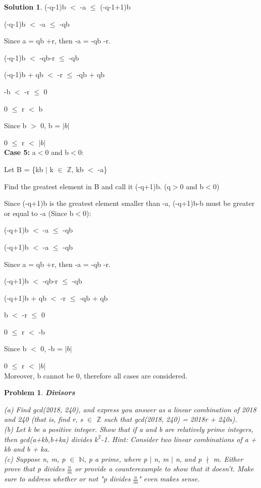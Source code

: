 \documentclass{article}
\newtheorem{problem}{Problem}
\theoremstyle{definition}
\newtheorem*{solution}{Solution}
\begin{document}
\begin{solution}
(-q-1)b \(<\) -a \(\leq\) (-q-1+1)b

(-q-1)b \(<\) -a \(\leq\) -qb

Since a = qb +r, then -a = -qb -r.

(-q-1)b \(<\) -qb-r \(\leq\) -qb

(-q-1)b + qb \(<\) -r \(\leq\) -qb + qb

-b \(<\) -r \(\leq\) 0

0 \(\leq\) r \(<\) b

Since b \(>\) 0, b = \(|b|\)

0 \(\leq\) r \(<\) \(|b|\)\\



\textbf{Case 5:} a\(<\)0 and b\(<\)0:

Let B = \{kb \(|\) k \(\in\) \(\mathbb{Z}\), kb \(<\) -a\}

Find the greatest element in B and call it (-q+1)b. (q\(>\)0 and b\(<\)0)

Since (-q+1)b is the greatest element smaller than -a, (-q+1)b-b must be greater or equal to -a (Since b\(<\)0):

(-q+1)b \(<\) -a \(\leq\) -qb

(-q+1)b \(<\) -a \(\leq\) -qb

Since a = qb +r, then -a = -qb -r.

(-q+1)b \(<\) -qb-r \(\leq\) -qb

(-q+1)b + qb \(<\) -r \(\leq\) -qb + qb

b \(<\) -r \(\leq\) 0

0 \(\leq\) r \(<\) -b

Since b \(<\) 0, -b = \(|b|\)

0 \(\leq\) r \(<\) \(|b|\)\\

Moreover, b cannot be 0, therefore all cases are considered.




\end{solution}




\begin{problem}

\textbf{Divisors}

(a) Find gcd(2018, 240), and express you answer as a linear combination of 2018 and 240 (that is, find r, s \(\in\) \(\mathbb{Z}\) such that gcd(2018, 240) = 2018r + 240s).\\

(b) Let k be a positive integer. Show that if a and b are relatively prime integers, then gcd(a+kb,b+ka) divides \(k^2\)-1. Hint: Consider two linear combinations of a + kb and b + ka.\\

(c) Suppose n, m, p \(\in\) \(\mathbb{N}\), p a prime, where p \(|\) n, m \(|\) n, and p \(\nmid\) m. Either prove that p divides \(\frac{n}{m}\) or provide a counterexample to show that it doesn't. Make sure to address whether or not "p divides \(\frac{n}{m}\)" even makes sense.\\

\end{problem}
\end{document}
